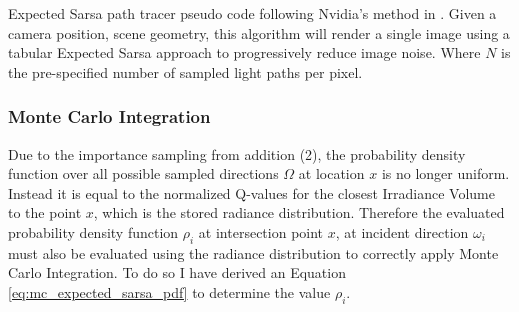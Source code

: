 \documentclass[../dissertation.tex]{subfiles}
\begin{document}
\begin{algorithm}[H]
\label{alg:expected_sarsa_pathtracer}
\SetAlgoLined
 \caption{Expected Sarsa path tracer pseudo code following Nvidia's method in \cite{dahm2017learning}. Given a camera position, scene geometry, this algorithm will render a single image using a tabular Expected Sarsa approach to progressively reduce image noise. Where $N$ is the pre-specified number of sampled light paths per pixel.}
\end{algorithm}

\subsubsection*{Monte Carlo Integration}

Due to the importance sampling from addition (2), the probability density function over all possible sampled directions $\Omega$ at location $x$ is no longer uniform. Instead it is equal to the normalized Q-values for the closest Irradiance Volume to the point $x$, which is the stored radiance distribution. Therefore the evaluated probability density function $\rho_i$ at intersection point $x$, at incident direction $\omega_i$ must also be evaluated using the radiance distribution to correctly apply Monte Carlo Integration. To do so I have derived an Equation \ref{eq:mc_expected_sarsa_pdf} to determine the value $\rho_i$.
\end{document}
